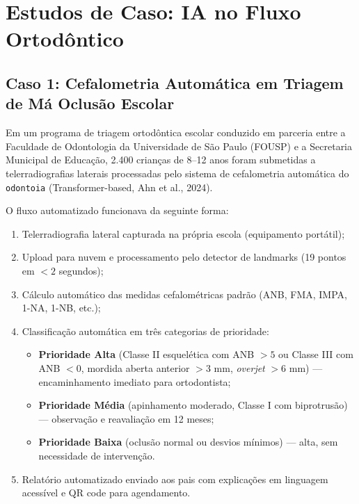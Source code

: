 
\section{Estudos de Caso: IA no Fluxo Ortodôntico}

\subsection{Caso 1: Cefalometria Automática em Triagem de Má Oclusão Escolar}

Em um programa de triagem ortodôntica escolar conduzido em parceria entre a Faculdade de Odontologia da Universidade de São Paulo (FOUSP) e a Secretaria Municipal de Educação, 2.400 crianças de 8--12 anos foram submetidas a telerradiografias laterais processadas pelo sistema de cefalometria automática do \texttt{odontoia} (Transformer-based, Ahn et al., 2024).

O fluxo automatizado funcionava da seguinte forma:
\begin{enumerate}
    \item Telerradiografia lateral capturada na própria escola (equipamento portátil);
    \item Upload para nuvem e processamento pelo detector de landmarks (19 pontos em $<2$ segundos);
    \item Cálculo automático das medidas cefalométricas padrão (ANB, FMA, IMPA, 1-NA, 1-NB, etc.);
    \item Classificação automática em três categorias de prioridade:
    \begin{itemize}
        \item \textbf{Prioridade Alta} (Classe II esquelética com ANB $> 5$\textdegree{} ou Classe III com ANB $< 0$\textdegree{}, mordida aberta anterior $>3$ mm, \textit{overjet} $>6$ mm) --- encaminhamento imediato para ortodontista;
        \item \textbf{Prioridade Média} (apinhamento moderado, Classe I com biprotrusão) --- observação e reavaliação em 12 meses;
        \item \textbf{Prioridade Baixa} (oclusão normal ou desvios mínimos) --- alta, sem necessidade de intervenção.
    \end{itemize}
    \item Relatório automatizado enviado aos pais com explicações em linguagem acessível e QR code para agendamento.
\end{enumerate}

